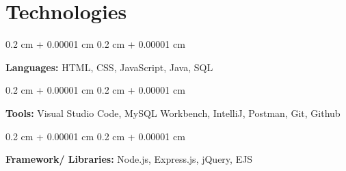 \documentclass[10pt, letterpaper]{article}
\newenvironment{onecolentry}{
    \begin{adjustwidth}{
        0.2 cm + 0.00001 cm
    }{
        0.2 cm + 0.00001 cm
    }
}{
    \end{adjustwidth}
} %
\begin{document}
    \section{Technologies}

        
        \begin{onecolentry}
            \textbf{Languages:} HTML, CSS, JavaScript, Java, SQL
        \end{onecolentry}

        \vspace{0.2 cm}

        \begin{onecolentry}
            \textbf{Tools:} Visual Studio Code, MySQL Workbench, IntelliJ, Postman, Git, Github
        \end{onecolentry}

        \vspace{0.2 cm}

        \begin{onecolentry}
            \textbf{Framework/ Libraries:} Node.js, Express.js, jQuery, EJS
        \end{onecolentry}


    \vspace{-0.3cm}
 
    
\end{document}
